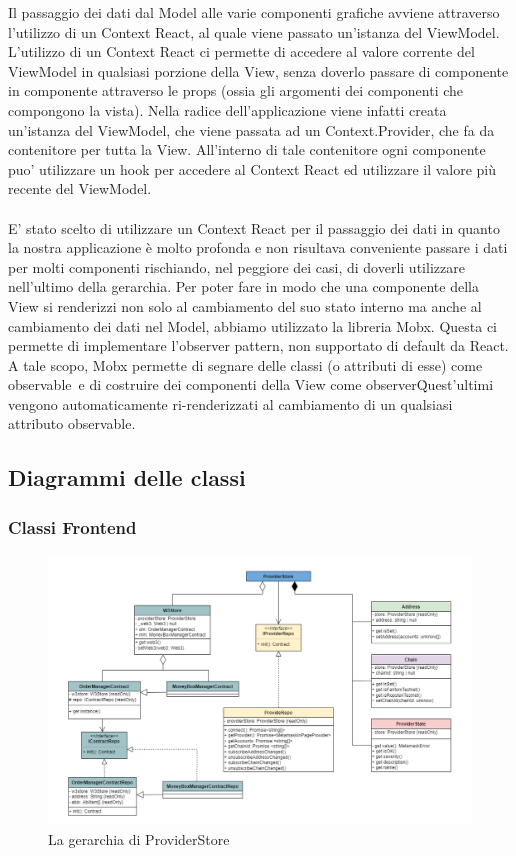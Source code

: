 Il passaggio dei dati dal Model alle varie componenti grafiche avviene attraverso l'utilizzo di un Context
React, al quale viene passato un'istanza del ViewModel. L'utilizzo di un Context React ci permette di
accedere al valore corrente del ViewModel in qualsiasi porzione della View, senza doverlo passare di
componente in componente attraverso le props (ossia gli argomenti dei componenti che compongono la
vista). Nella radice dell'applicazione viene infatti creata un'istanza del ViewModel, che viene passata
ad un Context.Provider, che fa da contenitore per tutta la View. All'interno di tale contenitore ogni
componente puo' utilizzare un hook per accedere al Context React ed utilizzare il valore più recente del ViewModel.
\\
\\
E' stato scelto di utilizzare un Context React per il passaggio dei dati in quanto la nostra applicazione è
molto profonda e non risultava conveniente passare i dati per molti componenti rischiando, nel peggiore
dei casi, di doverli utilizzare nell'ultimo della gerarchia.
Per poter fare in modo che una componente della View si renderizzi non solo al cambiamento del
suo stato interno ma anche al cambiamento dei dati nel Model, abbiamo utilizzato la libreria Mobx\glo.
Questa ci permette di implementare l'observer pattern\glo, non supportato di default da React. A tale
scopo, Mobx permette di segnare delle classi (o attributi di esse) come observable\glo\ e di costruire
dei componenti della View come observer\glo\. Quest'ultimi vengono automaticamente ri-renderizzati al
cambiamento di un qualsiasi attributo observable.

\subsection{Diagrammi delle classi}

\subsubsection{Classi Frontend}

\begin{figure}[H]
    \centering
    \includegraphics[scale = 0.5]{immagini/providerstore.png}
    \caption{La gerarchia di ProviderStore}
\end{figure}



